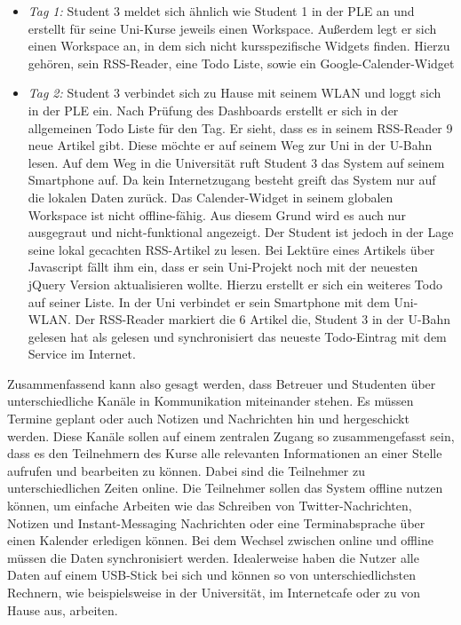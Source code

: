 \begin{itemize}
 \item \emph{Tag 1:} Student 3 meldet sich ähnlich wie Student 1 in der PLE an und erstellt für seine Uni-Kurse jeweils einen Workspace. Außerdem legt er sich einen Workspace an, in dem sich nicht kursspezifische Widgets finden. Hierzu gehören, sein RSS-Reader, eine Todo Liste, sowie ein Google-Calender-Widget
 \item \emph{Tag 2:} Student 3 verbindet sich zu Hause mit seinem WLAN und loggt sich in der PLE ein. Nach Prüfung des Dashboards erstellt er sich in der allgemeinen Todo Liste für den Tag. Er sieht, dass es in seinem RSS-Reader 9 neue Artikel gibt. Diese möchte er auf seinem Weg zur Uni in der U-Bahn lesen. Auf dem Weg in die Universität ruft Student 3 das System auf seinem Smartphone auf. Da kein Internetzugang besteht greift das System nur auf die lokalen Daten zurück. Das Calender-Widget in seinem globalen Workspace ist nicht offline-fähig. Aus diesem Grund wird es auch nur ausgegraut und nicht-funktional angezeigt. Der Student ist jedoch in der Lage seine lokal gecachten RSS-Artikel zu lesen. Bei Lektüre eines Artikels über Javascript fällt ihm ein, dass er sein Uni-Projekt noch mit der neuesten jQuery Version aktualisieren wollte. Hierzu erstellt er sich ein weiteres Todo auf seiner Liste.
 In der Uni verbindet er sein Smartphone mit dem Uni-WLAN. Der RSS-Reader markiert die 6 Artikel die, Student 3 in der U-Bahn gelesen hat als gelesen und synchronisiert das neueste Todo-Eintrag mit dem Service im Internet.  
\end{itemize}

Zusammenfassend kann also gesagt werden, dass Betreuer und Studenten über unterschiedliche Kanäle in Kommunikation miteinander stehen. Es müssen Termine geplant oder auch Notizen und Nachrichten hin und hergeschickt werden. Diese Kanäle sollen auf einem zentralen Zugang so zusammengefasst sein, dass es den Teilnehmern des Kurse alle relevanten Informationen an einer Stelle aufrufen und bearbeiten zu können. Dabei sind die Teilnehmer zu unterschiedlichen Zeiten online. Die Teilnehmer sollen das System offline nutzen können, um einfache Arbeiten wie das Schreiben von Twitter-Nachrichten, Notizen und Instant-Messaging Nachrichten oder eine Terminabsprache über einen Kalender erledigen können. Bei dem Wechsel zwischen online und offline müssen die Daten synchronisiert werden. Idealerweise haben die Nutzer alle Daten auf einem USB-Stick bei sich und können so von unterschiedlichsten Rechnern, wie beispielsweise in der Universität, im Internetcafe oder zu von Hause aus, arbeiten.

